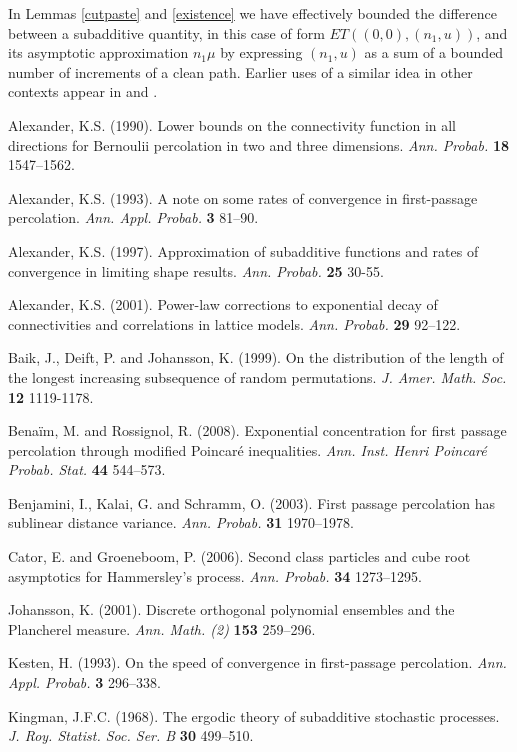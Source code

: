 \documentclass[12pt]{amsart}
\theoremstyle{plain}
\theoremstyle{definition}
\numberwithin{equation}{section}
\begin{document}
In Lemmas \ref{cutpaste} and \ref{existence} we have effectively bounded the difference between a subadditive quantity, in this case of form $ET((0,0),(n_1,u))$, and its asymptotic approximation $n_1\mu$ by expressing $(n_1,u)$ as a sum of a bounded number of increments of a clean path.  Earlier uses of a similar idea in other contexts appear in \cite{Al90} and \cite{Al01}.

\begin{thebibliography}{99}

 Alexander, K.S. (1990).  Lower bounds on the connectivity function in all directions for Bernoulii percolation in two and three dimensions.  \emph{Ann. Probab.} \textbf{18} 1547--1562.

 Alexander, K.S. (1993).  A note on some rates of convergence in first-passage percolation.  \emph{Ann. Appl. Probab.} \textbf{3} 81--90.

 Alexander, K.S. (1997). Approximation of
subadditive functions and rates of convergence in limiting
shape results.  \emph{Ann. Probab.} \textbf{25} 30-55.

  Alexander, K.S. (2001).  Power-law
corrections to exponential decay of connectivities
and correlations in lattice models. \emph{Ann. Probab.} \textbf{29} 92--122.

 Baik, J., Deift, P. and Johansson, K. (1999).
On the distribution of the length of the longest increasing subsequence of
random permutations.  \emph{J. Amer. Math. Soc.} \textbf{12} 1119-1178.

 Bena\"im, M. and Rossignol, R. (2008).  Exponential concentration for first passage percolation through modified Poincar\'e inequalities.    \emph{Ann. Inst. Henri Poincar\'e Probab. Stat.} \textbf{44} 544--573.

 Benjamini, I., Kalai, G. and Schramm, O. (2003).  First passage percolation has sublinear distance variance.  \emph{Ann. Probab.} \textbf{31} 1970--1978.

 Cator, E. and Groeneboom, P. (2006).  Second class particles and cube root asymptotics for Hammersley's process.  \emph{Ann. Probab.} \textbf{34} 1273--1295.

 Johansson, K. (2001).  Discrete orthogonal polynomial ensembles and the Plancherel measure.  \emph{Ann. Math. (2)} \textbf{153} 259--296.

 Kesten, H. (1993).  On the speed of convergence in first-passage percolation.  \emph{Ann. Appl. Probab.} \textbf{3} 296--338.

 Kingman, J.F.C. (1968).  The ergodic theory of subadditive stochastic processes.  \emph{J. Roy. Statist. Soc. Ser. B} \textbf{30} 499--510.

\end{thebibliography}
\end{document}
